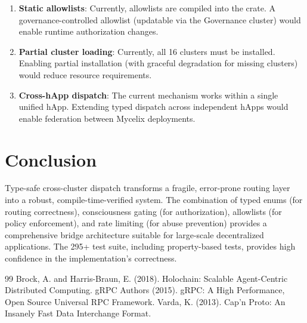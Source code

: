 \documentclass[11pt,twocolumn]{article}
\begin{document}
\begin{enumerate}
  \item \textbf{Static allowlists}: Currently, allowlists are compiled into
    the crate. A governance-controlled allowlist (updatable via the Governance
    cluster) would enable runtime authorization changes.
  \item \textbf{Partial cluster loading}: Currently, all 16 clusters must be
    installed. Enabling partial installation (with graceful degradation for
    missing clusters) would reduce resource requirements.
  \item \textbf{Cross-hApp dispatch}: The current mechanism works within a
    single unified hApp. Extending typed dispatch across independent hApps
    would enable federation between Mycelix deployments.
\end{enumerate}

\section{Conclusion}

Type-safe cross-cluster dispatch transforms a fragile, error-prone routing
layer into a robust, compile-time-verified system. The combination of typed
enums (for routing correctness), consciousness gating (for authorization),
allowlists (for policy enforcement), and rate limiting (for abuse prevention)
provides a comprehensive bridge architecture suitable for large-scale
decentralized applications. The 295+ test suite, including property-based
tests, provides high confidence in the implementation's correctness.

\begin{thebibliography}{99}
   Brock, A. and Harris-Braun, E. (2018). Holochain:
    Scalable Agent-Centric Distributed Computing.
   gRPC Authors (2015). gRPC: A High Performance, Open Source
    Universal RPC Framework.
   Varda, K. (2013). Cap'n Proto: An Insanely Fast Data
    Interchange Format.
\end{thebibliography}
\end{document}
